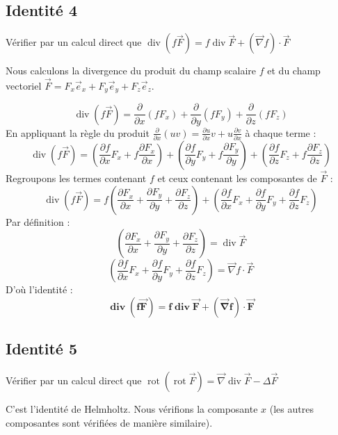 \documentclass[french]{yLectureNote}
\renewcommand{\vec}{\overrightarrow}
\begin{document}
\subsection{Identité 4}
Vérifier par un calcul direct que $\operatorname{div}(f\vec{F})=f \operatorname{div}\vec{F}+(\vec{\nabla}f)\cdot\vec{F}$

Nous calculons la divergence du produit du champ scalaire $f$ et du champ vectoriel $\vec{F} = F_x \vec{e}_x + F_y \vec{e}_y + F_z \vec{e}_z$.

$$
\operatorname{div}(f\vec{F}) = \frac{\partial}{\partial x}(fF_x) + \frac{\partial}{\partial y}(fF_y) + \frac{\partial}{\partial z}(fF_z)
$$
En appliquant la règle du produit $\frac{\partial}{\partial x}(uv) = \frac{\partial u}{\partial x}v + u\frac{\partial v}{\partial x}$ à chaque terme :
$$
\operatorname{div}(f\vec{F}) = \left(\frac{\partial f}{\partial x}F_x + f\frac{\partial F_x}{\partial x}\right) + \left(\frac{\partial f}{\partial y}F_y + f\frac{\partial F_y}{\partial y}\right) + \left(\frac{\partial f}{\partial z}F_z + f\frac{\partial F_z}{\partial z}\right)
$$
Regroupons les termes contenant $f$ et ceux contenant les composantes de $\vec{F}$ :
$$
\operatorname{div}(f\vec{F}) = f\left(\frac{\partial F_x}{\partial x} + \frac{\partial F_y}{\partial y} + \frac{\partial F_z}{\partial z}\right) + \left(\frac{\partial f}{\partial x}F_x + \frac{\partial f}{\partial y}F_y + \frac{\partial f}{\partial z}F_z\right)
$$
Par définition :
$$
\left(\frac{\partial F_x}{\partial x} + \frac{\partial F_y}{\partial y} + \frac{\partial F_z}{\partial z}\right) = \operatorname{div}\vec{F}
$$
$$
\left(\frac{\partial f}{\partial x}F_x + \frac{\partial f}{\partial y}F_y + \frac{\partial f}{\partial z}F_z\right) = \vec{\nabla}f \cdot \vec{F}
$$
D'où l'identité :
$$
\mathbf{\operatorname{div}(f\vec{F}) = f \operatorname{div}\vec{F}+(\vec{\nabla}f)\cdot\vec{F}}
$$

\subsection{Identité 5}
Vérifier par un calcul direct que $\operatorname{rot}(\operatorname{rot}\vec{F})=\vec{\nabla}\operatorname{div}\vec{F}-\Delta\vec{F}$

C'est l'identité de Helmholtz. Nous vérifions la composante $x$ (les autres composantes sont vérifiées de manière similaire).
\end{document}
